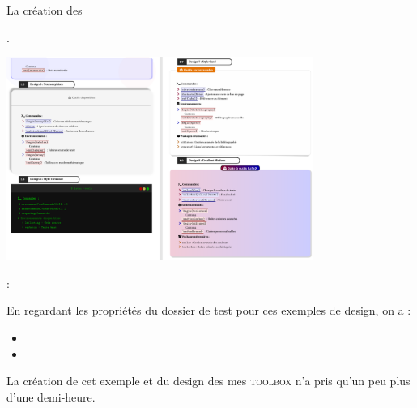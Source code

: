 \begin{bfbox}{La création des }
\begin{tcbenumerate}[2]
        \tcbitem {}. 
        \begin{center}
        \includegraphics[width=0.75\textwidth]{annexes/Example_craft_toolbox/4.png}
        \end{center}     
        
        \tcbitem {} :

        En regardant les propriétés du dossier de test pour ces exemples de design, on a :  
        \begin{itemize}[label=$\bullet$]
            \item {}
        
            \item {}
        \end{itemize}

        La création de cet exemple et du design des mes \textsc{toolbox} n'a pris qu'un peu plus d'une demi-heure.
    \end{tcbenumerate}
\end{bfbox}

